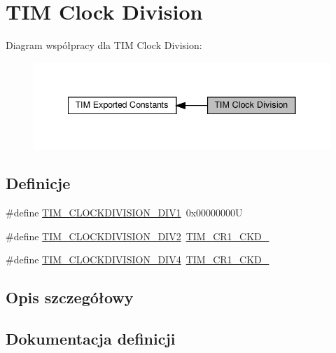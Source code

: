 \hypertarget{group___t_i_m___clock_division}{}\section{T\+IM Clock Division}
\label{group___t_i_m___clock_division}
Diagram współpracy dla T\+IM Clock Division\+:\nopagebreak
\begin{figure}[H]
\begin{center}
\leavevmode
\includegraphics[width=341pt]{group___t_i_m___clock_division}
\end{center}
\end{figure}
\subsection*{Definicje}
\begin{DoxyCompactItemize}
\item 
\#define \hyperlink{group___t_i_m___clock_division_ga309297ccd407a836ede6a42d4dc479c1}{T\+I\+M\+\_\+\+C\+L\+O\+C\+K\+D\+I\+V\+I\+S\+I\+O\+N\+\_\+\+D\+I\+V1}~0x00000000U
\item 
\#define \hyperlink{group___t_i_m___clock_division_gaf84a16da8edb80a3d8af91fbfc046181}{T\+I\+M\+\_\+\+C\+L\+O\+C\+K\+D\+I\+V\+I\+S\+I\+O\+N\+\_\+\+D\+I\+V2}~\hyperlink{group___peripheral___registers___bits___definition_ga458d536d82aa3db7d227b0f00b36808f}{T\+I\+M\+\_\+\+C\+R1\+\_\+\+C\+K\+D\+\_}
\item 
\#define \hyperlink{group___t_i_m___clock_division_ga7cac7491610ffc135ea9ed54f769ddbc}{T\+I\+M\+\_\+\+C\+L\+O\+C\+K\+D\+I\+V\+I\+S\+I\+O\+N\+\_\+\+D\+I\+V4}~\hyperlink{group___peripheral___registers___bits___definition_ga7ff2d6c2c350e8b719a8ad49c9a6bcbe}{T\+I\+M\+\_\+\+C\+R1\+\_\+\+C\+K\+D\+\_}
\end{DoxyCompactItemize}


\subsection{Opis szczegółowy}


\subsection{Dokumentacja definicji}
\mbox{\label{group___t_i_m___clock_division_ga309297ccd407a836ede6a42d4dc479c1}} 

